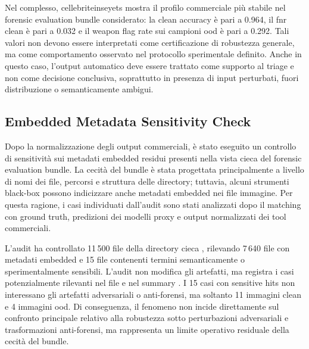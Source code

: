 Nel complesso, \gls{cellebriteinseyets} mostra il profilo commerciale più stabile
nel forensic evaluation bundle considerato: la clean accuracy è pari a 0.964, il
\gls{fnr} clean è pari a 0.032 e il weapon flag rate sui campioni \gls{ood} è
pari a 0.292. Tali valori non devono essere interpretati come certificazione di
robustezza generale, ma come comportamento osservato nel protocollo sperimentale
definito. Anche in questo caso, l'output automatico deve essere trattato come
supporto al triage e non come decisione conclusiva, soprattutto in presenza di
input perturbati, fuori distribuzione o semanticamente ambigui.



\subsection{Embedded Metadata Sensitivity Check}
\label{subsec:results-embedded-metadata-sensitivity}

Dopo la normalizzazione degli output commerciali, è stato eseguito un controllo
di sensitività sui metadati embedded residui presenti nella vista cieca del
forensic evaluation bundle. La cecità del bundle è stata progettata
principalmente a livello di nomi dei file, percorsi e struttura delle directory;
tuttavia, alcuni strumenti black-box possono indicizzare anche metadati embedded
nei file immagine. Per questa ragione, i casi individuati dall'audit sono stati
analizzati dopo il matching con ground truth, predizioni dei modelli proxy e
output normalizzati dei tool commerciali.

L'audit ha controllato 11\,500 file della directory cieca
,
rilevando 7\,640 file con metadati embedded e 15 file contenenti termini
semanticamente o sperimentalmente sensibili. L'audit non modifica gli artefatti,
ma registra i casi potenzialmente rilevanti nel file
e nel summary
.
I 15 casi con sensitive hits non interessano gli artefatti adversariali o
anti-forensi, ma soltanto 11 immagini clean e 4 immagini \gls{ood}. Di
conseguenza, il fenomeno non incide direttamente sul confronto principale
relativo alla robustezza sotto perturbazioni adversariali e trasformazioni
anti-forensi, ma rappresenta un limite operativo residuale della cecità del
bundle.

